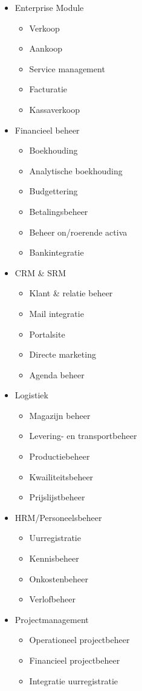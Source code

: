 \begin{itemize}
\item Enterprise Module
\begin{itemize}
    \item Verkoop
    \item Aankoop
    \item Service management
    \item Facturatie
    \item Kassaverkoop
\end{itemize}

\item Financieel beheer
\begin{itemize}
    \item Boekhouding
    \item Analytische boekhouding
    \item Budgettering
    \item Betalingsbeheer
    \item Beheer on/roerende activa
    \item Bankintegratie
\end{itemize}

\item CRM \& SRM
\begin{itemize}
    \item Klant \& relatie beheer
    \item Mail integratie
    \item Portalsite
    \item Directe marketing
    \item Agenda beheer
\end{itemize}

\item Logistiek
\begin{itemize}
    \item Magazijn beheer
    \item Levering- en transportbeheer
    \item Productiebeheer
    \item Kwailiteitsbeheer
    \item Prijslijstbeheer
\end{itemize}

\item HRM/Personeelsbeheer
\begin{itemize}
    \item Uurregistratie
    \item Kennisbeheer
    \item Onkostenbeheer
    \item Verlofbeheer
\end{itemize}

\item Projectmanagement
\begin{itemize}
    \item Operationeel projectbeheer
    \item Financieel projectbeheer
    \item Integratie uurregistratie
\end{itemize}

\end{itemize}

